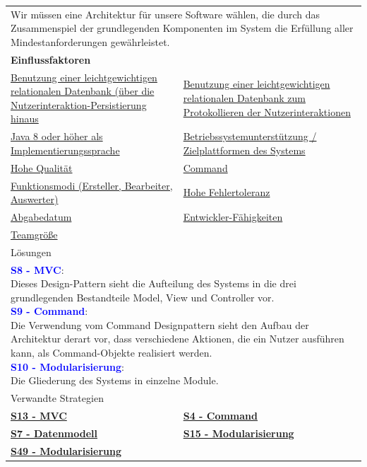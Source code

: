 \documentclass[enabledeprecatedfontcommands,fontsize=11pt,paper=a4,twoside]{scrartcl}
\newcounter{one}
\newcommand{\cb}[1]{{\textcolor{blue}{#1}}}
\begin{document}
\begin{tabular} {|p{8cm} p{8cm}|}
	\hline
	\rowcolor{prob}\multicolumn{2}{|l|}{\parbox{16cm}{\textbf{04: Auswahl der grundlegenden Softwarearchitektur}}} \\  \hline\hline 
	\multicolumn{2}{|l|}{\parbox{16cm}{Wir müssen eine Architektur für unsere Software wählen, die durch das Zusammenspiel der grundlegenden Komponenten im System die Erfüllung aller Mindestanforderungen gewährleistet.}}\rule{0pt}{4ex}\\ [1ex] \hline
	\multicolumn{2}{|l|}{\textbf{Einflussfaktoren}}\\
	\hyperlink {e}{Benutzung einer leichtgewichtigen relationalen Datenbank (über die Nutzerinteraktion-Persistierung hinaus} &
	\hyperlink {d}{Benutzung einer leichtgewichtigen relationalen Datenbank zum Protokollieren der Nutzerinteraktionen}\\ 
	\hyperlink{b}{Java 8 oder höher als Implementierungssprache} &
	\hyperlink {f}{Betriebssystemunterstützung / Zielplattformen des Systems}\\
	\hyperlink {h}{Hohe Qualität}&
	\hyperlink {i}{Command} \\
	\hyperlink {z}{Funktionsmodi (Ersteller, Bearbeiter, Auswerter)}  &
	\hyperlink {tt}{Hohe Fehlertoleranz} \\
	\hyperlink {uu}{Abgabedatum} &
	\hyperlink {vv}{Entwickler-Fähigkeiten} \\
	\hyperlink {xx}{Teamgröße} &
	\\ \hline
	\multicolumn{2}{|l|}{Lösungen} \\
	\multicolumn{2}{|l|}{\parbox{16cm}{
			\textbf{\cb{\hypertarget{bbb}{S8 - MVC}}}: \\
			Dieses Design-Pattern sieht die Aufteilung des Systems in die drei grundlegenden Bestandteile Model, View und Controller vor. \\
			\textbf{\cb{\hypertarget{command}{S9 - Command}}}: \\
			Die Verwendung vom Command Designpattern sieht den Aufbau der Architektur derart vor, dass verschiedene Aktionen, die ein Nutzer ausführen kann, als Command-Objekte realisiert werden.\\
			\textbf{\cb{\hypertarget{aadd}{S10 - Modularisierung}}}: \\
			Die Gliederung des Systems in einzelne Module.
	} }\\ [8ex] \hline
	\multicolumn{2}{|l|}{Verwandte Strategien} \\
	\textbf{\hyperlink {modelviewcontroller}{S13 - MVC}} &
	\textbf{\hyperlink {zz}{S4 - Command}} \\
	\textbf{\hyperlink {aaa}{S7 - Datenmodell}} &
	\textbf{\hyperlink {aabb}{S15 - Modularisierung}} \\
	\textbf{\hyperlink {aaaa}{S49 - Modularisierung}}&
	\\\hline
\end{tabular}\\ \\ \\
\end{document}
